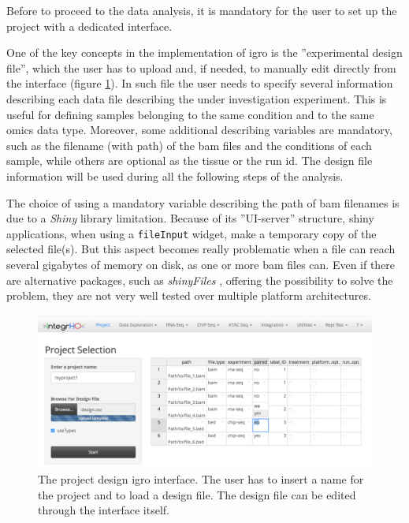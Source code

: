 Before to proceed to the data analysis, it is mandatory for the user to set up the project with a dedicated interface.

One of the key concepts in the implementation of \gls{igro} is the ''experimental design file'', which the user has to upload and, if needed, to manually edit directly from the interface (figure \ref{fig:integrhodesign}).
In such file the user needs to specify several information describing each data file describing the under investigation experiment.
This is useful for defining samples belonging to the same condition and to the same omics data type. Moreover, some additional describing variables are mandatory, such as the filename (with path) of the \gls{bam} files and the conditions of each sample, while others are optional as the tissue or the run id. 
The design file information will be used during all the following steps of the analysis.


The choice of using a mandatory variable describing the path of  \gls{bam} filenames is due to a \textit{Shiny} library limitation. 
Because of its ''UI-server'' structure, shiny applications, when using a \lstinline!fileInput! widget, make a temporary copy of the selected file(s).
But this aspect becomes really problematic when a file can reach several gigabytes of memory on disk, as one or more \gls{bam} files can.
Even if there are alternative packages, such as \textit{shinyFiles} \cite{Pedersen}, offering the possibility to solve the problem, they are not very well tested over multiple platform architectures. %

\begin{figure}[ht]
\centering
\includegraphics[width=\textwidth, keepaspectratio]{img/integrho/design.png}
\caption[\gls{igro} design interface]{The project design \gls{igro} interface. The user has to insert a name for the project and to load a design file.
The design file can be edited through the interface itself.}
\label{fig:integrhodesign}
\end{figure}

